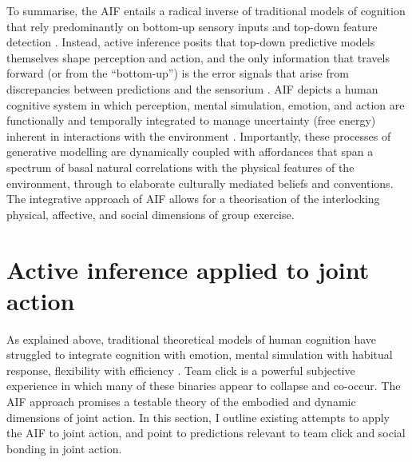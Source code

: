\begin{CJK}{UTF8}{gbsn}
To summarise, the AIF entails a radical inverse of traditional models of cognition that rely predominantly on bottom-up sensory inputs and top-down feature detection \citep[e.g.,][]{Marr1985}. Instead, active inference posits that top-down predictive models themselves shape perception and action, and the only information that travels forward (or from the ``bottom-up'') is the error signals that arise from discrepancies between predictions and the sensorium \citep{Pickering2014}.  AIF depicts a human cognitive system in which perception, mental simulation, emotion, and action are functionally and temporally integrated to manage uncertainty (free energy) inherent in interactions with the environment \citep{Clark2013}.  Importantly, these processes of generative modelling are dynamically coupled with affordances that span a spectrum of basal natural correlations with the physical features of the environment, through to elaborate culturally mediated beliefs and conventions.  The integrative approach of AIF allows for a theorisation of the interlocking physical, affective, and social dimensions of group exercise.


\section{Active inference applied to joint action \label{sect:activeInfJA}}
As explained above, traditional theoretical models of human cognition have struggled to integrate cognition with emotion, mental simulation with habitual response, flexibility with efficiency \citep{Clark2015}.
Team click is a powerful subjective experience in which many of these binaries appear to collapse and co-occur.  The AIF approach promises a testable theory of the embodied and dynamic dimensions of joint action.  In this section, I outline existing attempts to apply the AIF to joint action, and point to predictions relevant to team click and social bonding in joint action.


\end{CJK}
